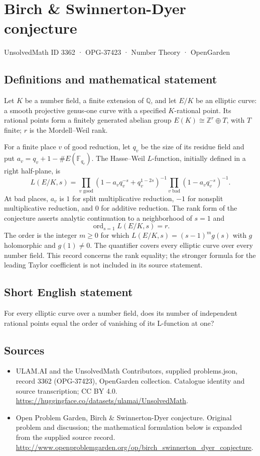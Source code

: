 \documentclass[11pt,a4paper]{article}
\begin{document}
\section*{Birch \& Swinnerton-Dyer conjecture}\label{3362}
{\small UnsolvedMath ID 3362 · OPG-37423 · Number Theory · OpenGarden}
\subsection{Definitions and mathematical statement}
Let $K$ be a number field, a finite extension of $\mathbb Q$, and let
$E/K$ be an elliptic curve: a smooth projective genus-one curve with
a specified $K$-rational point. Its rational points form a finitely
generated abelian group $E(K)\cong\mathbb Z^r\oplus T$, with $T$
finite; $r$ is the Mordell--Weil rank.

For a finite place $v$ of good reduction, let $q_v$ be the size of
its residue field and put $a_v=q_v+1-\#E(\mathbb F_{q_v})$. The
Hasse--Weil $L$-function, initially defined in a right half-plane, is
\[
 L(E/K,s)=\prod_{v\text{ good}}
 (1-a_vq_v^{-s}+q_v^{1-2s})^{-1}
 \prod_{v\text{ bad}}(1-a_vq_v^{-s})^{-1}.
\]
At bad places, $a_v$ is $1$ for split multiplicative reduction, $-1$
for nonsplit multiplicative reduction, and $0$ for additive reduction.
The rank form of the conjecture asserts analytic continuation to a
neighborhood of $s=1$ and
\[
                    \operatorname{ord}_{s=1}L(E/K,s)=r.
\]
The order is the integer $m\ge0$ for which
$L(E/K,s)=(s-1)^m g(s)$ with $g$ holomorphic and $g(1)\ne0$.
The quantifier covers every elliptic curve over every number field.
This record concerns the rank equality; the stronger formula for the
leading Taylor coefficient is not included in its source statement.
\subsection{Short English statement}
For every elliptic curve over a number field, does its number of independent rational points equal the order of vanishing of its L-function at one?
\subsection{Sources}
\begin{itemize}
\item[S1] ULAM.AI and the UnsolvedMath Contributors, supplied problems.json, record 3362 (OPG-37423), OpenGarden collection. Catalogue identity and source transcription; CC BY 4.0.
\url{https://huggingface.co/datasets/ulamai/UnsolvedMath}.
\item[S2] Open Problem Garden, Birch \& Swinnerton-Dyer conjecture. Original problem and discussion; the mathematical formulation below is expanded from the supplied source record.
\url{http://www.openproblemgarden.org/op/birch_swinnerton_dyer_conjecture}.
\end{itemize}
\end{document}
